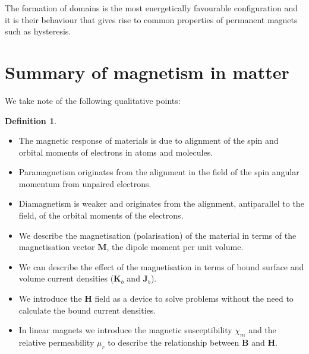 \documentclass[12pt,chapterprefix=false,dvipsnames]{scrbook}
\theoremstyle{dotless}
\theoremstyle{definition}
\newtheorem{protodefinition}{Definition}[section]
\newenvironment{definition}
{\colorlet{shadecolor}{black!15}\begin{shaded}\begin{protodefinition}}
			{\end{protodefinition}\end{shaded}}
\begin{document}
The formation of domains is the most energetically favourable
configuration and it is their behaviour that gives rise to
common properties of permanent magnets such as hysteresis.

\section{Summary of magnetism in matter}%
\label{sec:summary_of_magnetism_in_matter}

We take note of the following qualitative points:

\begin{definition}
	\begin{itemize}
		Magnetism in matter concerns the following:
		\item The magnetic response of materials is due to alignment of the
		      spin and orbital moments of electrons in atoms and molecules.
		\item Paramagnetism originates from the alignment in the field of the
		      spin angular momentum from unpaired electrons.
		\item Diamagnetism is weaker and originates from the alignment,
		      antiparallel to the field, of the orbital moments of the
		      electrons.
		\item We describe the magnetisation (polarisation) of the material in
		      terms of the magnetisation vector $\bm{M}$, the
		      dipole moment per unit volume.
		\item We can describe the effect of the magnetisation in terms of
		      bound surface and volume current densities
		      ($\bm{K}_b$ and $\bm{J}_b$).
		\item We introduce the $\bm{H}$ field as a device to
		      solve problems without the need to calculate the bound current
		      densities.
		\item In linear magnets we introduce the magnetic susceptibility
		      $\chi_m$ and the relative permeability
		      $\mu_r$ to describe the relationship between
		      $\bm{B}$ and $\bm{H}$.
	\end{itemize}
\end{definition}

%
\end{document}
